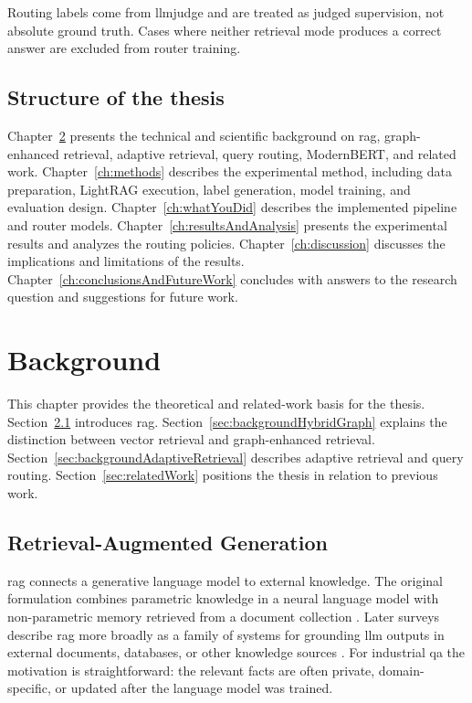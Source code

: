 \documentclass[english, bibtex]{kththesis}               %
\numberwithin{listing}{chapter}
\begin{document}
Routing labels come from \gls{llmjudge} and are treated as judged supervision, not absolute ground truth. Cases where neither retrieval mode produces a correct answer are excluded from router training.

\section{Structure of the thesis}
\label{sec:structure}

Chapter~\ref{ch:background} presents the technical and scientific background on \gls{rag}, graph-enhanced retrieval, adaptive retrieval, query routing, ModernBERT, and related work. Chapter~\ref{ch:methods} describes the experimental method, including data preparation, LightRAG execution, label generation, model training, and evaluation design. Chapter~\ref{ch:whatYouDid} describes the implemented pipeline and router models. Chapter~\ref{ch:resultsAndAnalysis} presents the experimental results and analyzes the routing policies. Chapter~\ref{ch:discussion} discusses the implications and limitations of the results. Chapter~\ref{ch:conclusionsAndFutureWork} concludes with answers to the research question and suggestions for future work.

\cleardoublepage
\chapter{Background}
\label{ch:background}
This chapter provides the theoretical and related-work basis for the thesis. Section~\ref{sec:backgroundRag} introduces \gls{rag}. Section~\ref{sec:backgroundHybridGraph} explains the distinction between vector retrieval and graph-enhanced retrieval. Section~\ref{sec:backgroundAdaptiveRetrieval} describes adaptive retrieval and query routing. Section~\ref{sec:relatedWork} positions the thesis in relation to previous work.

\section{Retrieval-Augmented Generation}
\label{sec:backgroundRag}

\Gls{rag} connects a generative language model to external knowledge. The original formulation combines parametric knowledge in a neural language model with non-parametric memory retrieved from a document collection \cite{lewis2020rag}. Later surveys describe \gls{rag} more broadly as a family of systems for grounding \gls{llm} outputs in external documents, databases, or other knowledge sources \cite{gao2023ragsurvey}. For industrial \gls{qa} the motivation is straightforward: the relevant facts are often private, domain-specific, or updated after the language model was trained.
\end{document}
